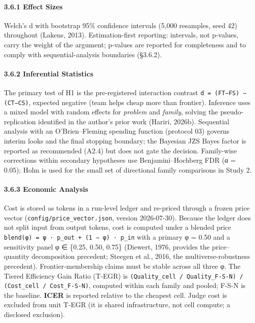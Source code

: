 \documentclass[11pt,a4paper]{article}
\begin{document}
\paragraph{3.6.1 Effect Sizes}

Welch's d with bootstrap 95\% confidence intervals (5,000 resamples,
seed 42) throughout (Lakens, 2013). Estimation-first reporting:
intervals, not p-values, carry the weight of the argument; p-values
are reported for completeness and to comply with sequential-analysis
boundaries (§3.6.2).

\paragraph{3.6.2 Inferential Statistics}

The primary test of H1 is the pre-registered interaction contrast
\texttt{d = (FT−FS) − (CT−CS)}, expected negative (team helps cheap more than
frontier). Inference uses a mixed model with random effects for
\textit{problem} and \textit{family}, solving the pseudo-replication identified in
the author's prior work (Hariri, 2026b). Sequential analysis with an
O'Brien–Fleming spending function (protocol 03) governs interim looks
and the final stopping boundary; the Bayesian JZS Bayes factor is
reported as recommended (A2.4) but does not gate the decision.
Family-wise corrections within secondary hypotheses use
Benjamini–Hochberg FDR (α = 0.05); Holm is used for the small set of
directional family comparisons in Study 2.

\paragraph{3.6.3 Economic Analysis}

Cost is stored as tokens in a run-level ledger and re-priced through a
frozen price vector (\texttt{config/price\_vector.json}, version 2026-07-30).
Because the ledger does not split input from output tokens, cost is
computed under a blended price
\texttt{blend(φ) = φ · p\_out + (1 − φ) · p\_in} with a primary φ = 0.50 and a
sensitivity panel φ ∈ \{0.25, 0.50, 0.75\} (Diewert, 1976, provides the
price–quantity decomposition precedent; Steegen et al., 2016, the
multiverse-robustness precedent). Frontier-membership claims must be
stable across all three φ. The \textit{}Tiered Efficiency Gain Ratio
(T-EGR)\textit{} is \texttt{(Quality\_cell / Quality\_F-S-N) / (Cost\_cell / Cost\_F-S-N)},
computed within each family and pooled; F-S-N is the baseline.
\textbf{ICER} is reported relative to the cheapest cell. Judge cost is
excluded from unit T-EGR (it is shared infrastructure, not cell
compute; a disclosed exclusion).
\end{document}
